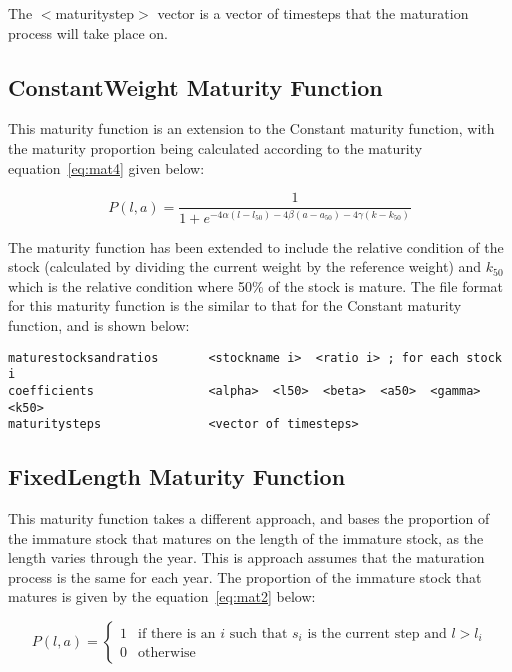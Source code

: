 \documentclass [a4paper, 10pt]{book}
\begin{document}
The $<$maturitystep$>$ vector is a vector of timesteps that the maturation process will take place on.

\subsection{ConstantWeight Maturity Function}
This maturity function is an extension to the Constant maturity function, with the maturity proportion being calculated according to the maturity equation~\ref{eq:mat4} given below:

\begin{equation}\label{eq:mat4}
P(l, a) = \frac{1}{ 1 + e^{-4\alpha(l - l_{50}) -4\beta(a - a_{50}) -4\gamma(k - k_{50})}}
\end{equation}

The maturity function has been extended to include the relative condition of the stock (calculated by dividing the current weight by the reference weight) and $k_{50}$ which is the relative condition where 50\% of the stock is mature.  The file format for this maturity function is the similar to that for the Constant maturity function, and is shown below:

{\small\begin{verbatim}
maturestocksandratios       <stockname i>  <ratio i> ; for each stock i
coefficients                <alpha>  <l50>  <beta>  <a50>  <gamma>  <k50>
maturitysteps               <vector of timesteps>
\end{verbatim}}

\subsection{FixedLength Maturity Function}
This maturity function takes a different approach, and bases the proportion of the immature stock that matures on the length of the immature stock, as the length varies through the year.  This is approach assumes that the maturation process is the same for each year.  The proportion of the immature stock that matures is given by the equation~\ref{eq:mat2} below:

\begin{equation}\label{eq:mat2}
P(l, a) =
\begin{cases}
1 & \textrm{if there is an $i$ such that $s_i$ is the current step and $l > l_i$} \\
0 & \textrm{otherwise}
\end{cases}
\end{equation}
\end{document}
